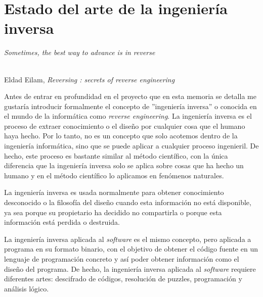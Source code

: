 \chapter{Estado del arte de la ingeniería inversa}
\label{cap:estadoDelArte}

\begin{flushright}
    \begin{minipage}[]{10cm}
        \emph{Sometimes, the best way to advance is in reverse}\\
    \end{minipage}\\

    Eldad Eilam, \textit{Reversing : secrets of reverse engineering}\\
\end{flushright}

\vspace{1cm}


Antes de entrar en profundidad en el proyecto que en esta memoria se detalla me
gustaría introducir formalmente el concepto de ''ingeniería inversa'' o conocida
en el mundo de la informática como \textit{reverse engineering}. La ingeniería
inversa es el proceso de extraer conocimiento o el diseño por cualquier cosa que 
el humano haya hecho. Por lo tanto, no es un concepto que solo acotemos dentro de
la ingeniería informática, sino que se puede aplicar a cualquier proceso ingenieril.
De hecho, este proceso es bastante similar al método científico, con la única diferencia
que la ingeniería inversa solo se aplica sobre cosas que ha hecho un humano y en el
método científico lo aplicamos en fenómenos naturales.

La ingeniería inversa es usada normalmente para obtener conocimiento desconocido o la
filosofía del diseño cuando esta información no está disponible, ya sea porque su
propietario ha decidido no compartirla o porque esta información está perdida o 
destruida. \cite{alma991003132729706711}

La ingeniería inversa aplicada al \textit{software} es el mismo concepto, pero aplicada
a programa en su formato binario, con el objetivo de obtener el código fuente en un
lenguaje de programación concreto y así poder obtener información como el diseño del
programa. De hecho, la ingeniería inversa aplicada al \textit{software} requiere
diferentes artes: descifrado de códigos, resolución de puzzles, programación y análisis
lógico.

